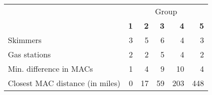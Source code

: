 \begin{comment}
\begin{tabu} to \linewidth {lrrrrrr}
\toprule
  \textbf{Group} & \textbf{1} & \textbf{2} & \textbf{3} & \textbf{4} & \textbf{5} & \textbf{6} \\
\hline
No. of skimmers & 2 & 2 & 2 & 2 & 5 & 3 \\

Seen across stations & 1 & 1 & 2 & 2 & 2 & 2\\

Min. distance in MAC address & 17 & 166 & 9 & 3 & 4 & 4 \\

Min. distance between & & & & & & \\
closest MACs (miles) & 0 & 0 & 17 & 17 & 17 & 448 \\
\bottomrule
\end{tabu}
\end{comment}
\begin{tabu} to \linewidth {lrrrrr}
\toprule
   &  \\
   \cmidrule(lr){2-6}
   & \textbf{1} & \textbf{2}  & \textbf{3} & \textbf{4} & \textbf{5} \\
\hline
Skimmers & 3 & 5 & 6 & 4 & 3 \\

Gas stations & 2 & 2 & 5 & 4 & 2\\

Min. difference in MACs & 1 & 4 & 9 & 10 & 4 \\

Closest MAC distance (in miles) & 0 & 17 & 59 & 203 & 448 \\
\bottomrule
\end{tabu}
